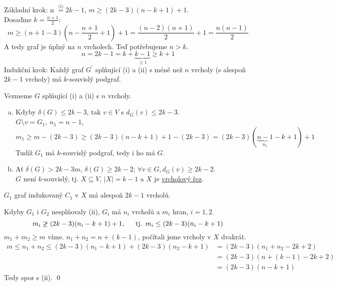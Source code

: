 Základní krok: n $\stackrel{\text{(i)}}{=}2k-1$, $m \geq (2k-3)(n-k+1)+1$.\\
Dosaďme $k = \frac{n+1}{2}$:
\begin{equation}
    m \geq (n+1-3)\left(n-\frac{n+1}{2}+1\right)+1 = \frac{(n-2)(n+1)}{2}+1 = \frac{n(n-1)}{2}
\end{equation}
A tedy graf je úplný na $n$ vrcholech. Teď potřebujeme $n>k$.
\begin{equation}
    n = 2k-1 = k + \underbrace{k-1}_{\geq 1} \geq k+1
\end{equation}
Indukční krok: Každý graf $G^\prime$ splňující (i) a (ii) s méně než $n$ vrcholy (s alespoň $2k-1$ vrcholy) má 
$k$-souvislý podgraf.

Vezmeme $G$ splňující (i) a (ii) s $n$ vrcholy.
\begin{enumerate}[(a)]
    \item Kdyby $\delta(G) \leq 2k-3$, tak $v \in V$ s $d_G(v) \leq 2k-3$.\\
    $G \setminus v = G_1$, $n_1=n-1$,
    \begin{equation*}
        m_1 \geq m-(2k-3) \geq (2k-3)(n-k+1)+1 - (2k-3) = (2k-3)(\underbrace{n-1}_{n_1}-k+1)+1
    \end{equation*}
    Tudíž $G_1$ má $k$-souvislý podgraf, tedy i ho má $G$.
    \item Ať $\delta(G) > 2k-3m$, $\delta(G) \geq 2k-2$; $\forall v \in G, d_G(v)\geq 2k-2$.\\
    $G$ není $k$-souvislý, tj. $X \subseteq V$, $|X|=k-1$ a $X$ je \hyperref[vrchRez]{vrcholový řez}.
\end{enumerate}


$G_1$ graf indukovaný $C_1$ v $X$ má alespoň $2k-1$ vrcholů.

Kdyby $G_1$ i $G_2$ nesplňovaly (ii), $G_i$ má $n_i$ vrcholů a $m_i$ hran, $i=1,2$.
\begin{equation}
    m_i \not\geq (2k-3)(n_i-k+1)+1, \hspace{1.5em} \text{tj. } m_i \leq (2k-3)(n_i-k+1)
\end{equation}
$m_1+m_2 \geq m$ víme. $n_1+n_2 = n+(k-1)$, počítali jsme vrcholy v $X$ dvakrát.
\begin{align*}
    m \leq n_1 + n_2 \leq (2k-3)(n_1-k+1)+(2k-3)(n_2-k+1) &= (2k-3)(n_1+n_2-2k+2) \\
    &= (2k-3)(n+(k-1)-2k+2) \\
    &= (2k-3)(n-k+1)
\end{align*}
Tedy spor s (ii). 
\hspace{\fill} \qed

